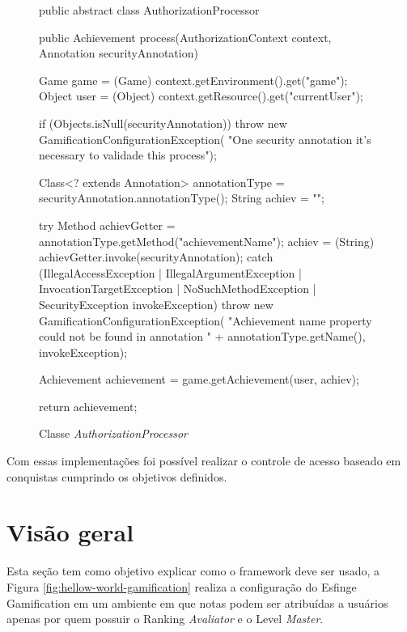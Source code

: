 \begin{figure}[H]
    \centering
    \caption{Classe \textit{AuthorizationProcessor}}
    \begin{java}
public abstract class AuthorizationProcessor {

	public Achievement process(AuthorizationContext context, Annotation securityAnnotation) {
		
		Game game = (Game) context.getEnvironment().get("game");
		Object user = (Object) context.getResource().get("currentUser");

		if (Objects.isNull(securityAnnotation))
			throw new GamificationConfigurationException(
					"One security annotation it's necessary to validade this process");

		Class<? extends Annotation> annotationType = securityAnnotation.annotationType();
		String achiev = "";

		try {
			Method achievGetter = annotationType.getMethod("achievementName");
			achiev = (String) achievGetter.invoke(securityAnnotation);
		} catch (IllegalAccessException | IllegalArgumentException | InvocationTargetException | NoSuchMethodException
				| SecurityException invokeException) {
			throw new GamificationConfigurationException(
					"Achievement name property could not be found in annotation " + annotationType.getName(),
					invokeException);
		}

		Achievement achievement = game.getAchievement(user, achiev);

		return achievement;
	}
}
    \end{java}
    \label{fig:authorization-processor}
\end{figure}

\par Com essas implementações foi possível realizar o controle de acesso baseado em conquistas cumprindo os objetivos definidos.

\section{Visão geral}

\par Esta seção tem como objetivo explicar como o framework deve ser usado, a Figura \ref{fig:hellow-world-gamification} realiza a configuração do Esfinge Gamification em um ambiente em que notas podem ser atribuídas a usuários apenas por quem possuir o Ranking \textit{Avaliator} e o Level \textit{Master}.


